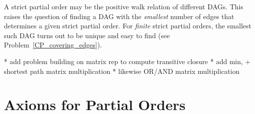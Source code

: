 A strict partial order may be the positive walk relation of different
DAGs.  \iffalse The divisibility partial order can also be more
economically represented by the walk relation in a DAG.
\hyperdef{divisibility}{DAG}{A DAG whose \emph{path} relation is
  divisibility} on $\set{1,2,\dots,12}$ is shown in
Figure~\ref{fig:divisibility-DAG}; the arrowheads are omitted in the
Figure, and edges are understood to point upwards.

\begin{figure}
\graphic{divi2}
\caption{A DAG whose Walk Relation is Divisibility on $\set{1,2,\dots,12}$.}
\label{fig:divisibility-DAG}
\end{figure}

If we're using a DAG to represent a partial order---so all we care
about is the walk relation of the DAG---we could replace the DAG with
any other DAG with the same walk relation.  \fi This raises the
question of finding a DAG with the \emph{smallest} number of edges
that determines a given strict partial order.  For \emph{finite}
strict partial orders, the smallest such DAG turns out to be unique
and easy to find (see Problem~\ref{CP_covering_edges}).

\begin{problems}
\practiceproblems

\classproblems
{}

\end{problems}

\begin{editingnotes}
* add problem building on matrix rep to compute transitive closure
* add min, + shortest path matrix  multiplication
* likewise OR/AND matrix multiplication
\end{editingnotes}


\iffalse
\subsection{Weak Partial Orders}\label{partial_order_sec}

, but so is the containment relation on sets
and the divisibility relation on integers.
\fi

\iffalse

\section{Axioms for Partial Orders}

